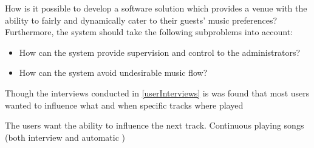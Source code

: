How is it possible to develop a software solution which provides a venue with the ability to fairly and dynamically cater to their guests' music preferences?\\
Furthermore, the system should take the following subproblems into account:
\begin{itemize}
\item How can the system provide supervision and control to the administrators?
\item How can the system avoid undesirable music flow?
\end{itemize}

Though the interviews conducted in \cref{userInterviews} is was found that most users wanted to influence what and when specific tracks where played

The users want the ability to influence the next track.
Continuous playing songs (both interview and automatic )